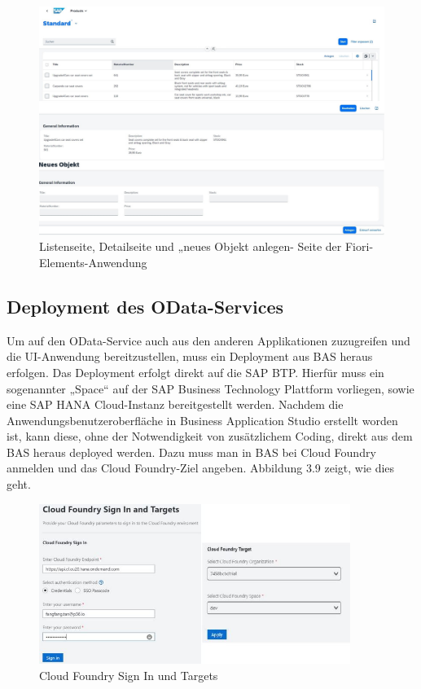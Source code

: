 \begin{figure}[htbp]
 \centering
 \includegraphics[width=1.0\textwidth]{Bilder/fiori_element/3_8_Fiori_Element_list.jpg}
 \caption{Listenseite, Detailseite und „neues Objekt anlegen- Seite der Fiori-Elements-Anwendung}
\end{figure}

\subsection{Deployment des OData-Services}

Um auf den OData-Service auch aus den anderen Applikationen zuzugreifen und die UI-Anwendung bereitzustellen, muss ein Deployment aus BAS heraus erfolgen. Das Deployment erfolgt direkt auf die SAP BTP. Hierfür muss ein sogenannter „Space“ auf der SAP Business Technology Plattform vorliegen, sowie eine SAP HANA Cloud-Instanz bereitgestellt werden. Nachdem die Anwendungsbenutzeroberfläche in Business Application Studio erstellt worden ist, kann diese, ohne der Notwendigkeit von zusätzlichem Coding, direkt aus dem BAS heraus deployed werden. Dazu muss man in BAS bei Cloud Foundry anmelden und das Cloud Foundry-Ziel angeben. Abbildung 3.9 zeigt, wie dies geht. 

\begin{figure}[htbp]
 \centering
 \includegraphics[width=0.9\textwidth]{Bilder/fiori_element/3_9_cloud_foundry_targets.jpg}
 \caption{Cloud Foundry Sign In und Targets}
\end{figure}

